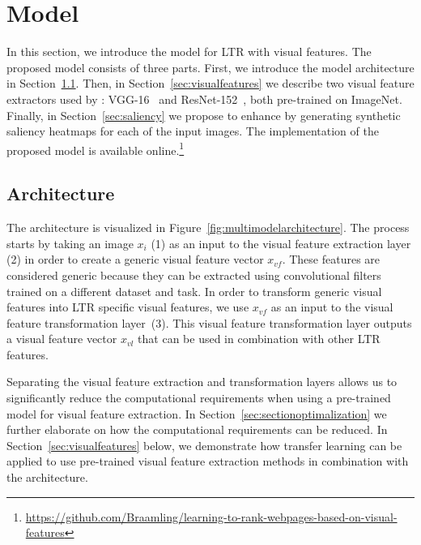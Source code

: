 
\section{\protect\modelname{} Model}
In this section, we introduce the \modelname{} model for \ac{LTR} with visual features.
The proposed model consists of three parts.
First, we introduce the model architecture in Section~\ref{sec:multimodal}.
Then, in Section~\ref{sec:visualfeatures} we describe two visual feature extractors used by \modelname{}:
VGG-16~\cite{simonyan2014very} and ResNet-152~\cite{he2016deep}, both pre-trained on ImageNet.
Finally, in Section~\ref{sec:saliency} we propose to enhance \modelname{} by generating synthetic saliency heatmaps for each of the input images.
 The implementation of the proposed \modelname{} model is available online.\footnote{\label{coderef}\url{https://github.com/Braamling/learning-to-rank-webpages-based-on-visual-features}}

\subsection{Architecture} \label{sec:multimodal}
The \modelname{} architecture is visualized in Figure~\ref{fig:multimodelarchitecture}. 
The process starts by taking an image $x_i$ (1) as an input to the visual feature extraction layer (2) in order to create a generic visual feature vector $x_{vf}$. 
These features are considered generic because they can be extracted using convolutional filters trained on a different dataset and task. 
In order to transform generic visual features into \ac{LTR} specific visual features, we use $x_{vf}$ as an input to the visual feature transformation layer~(3).
This visual feature transformation layer outputs a visual feature vector $x_{vl}$ that can be used in combination with other \ac{LTR} features. 

Separating the visual feature extraction and transformation layers allows us to significantly reduce the computational requirements when using a pre-trained model for visual feature extraction. 
In Section~\ref{sec:sectionoptimalization} we further elaborate on how the computational requirements can be reduced.
In Section~\ref{sec:visualfeatures} below, we demonstrate how transfer learning can be applied to use pre-trained visual feature extraction methods in combination with the \modelname{} architecture.

